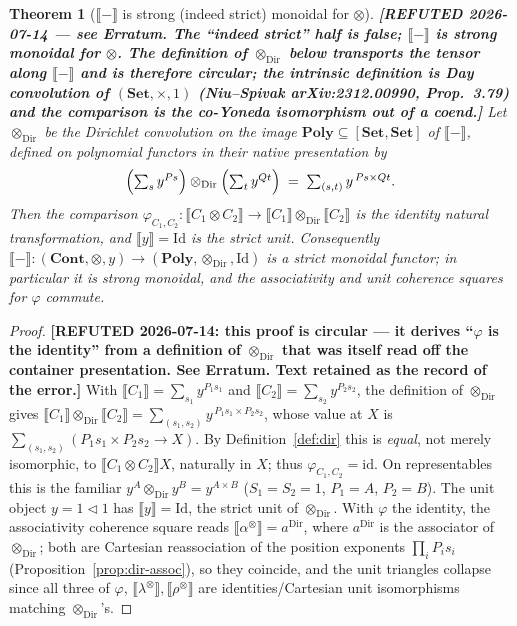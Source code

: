 \documentclass[11pt]{article}
\newtheorem{theorem}{Theorem}
\theoremstyle{definition}
\newcommand{\Set}{\mathbf{Set}}
\newcommand{\Cont}{\mathbf{Cont}}
\newcommand{\Poly}{\mathbf{Poly}}
\newcommand{\ext}[1]{\llbracket #1 \rrbracket}
\newcommand{\tri}{\mathbin{\triangleleft}}
\newcommand{\dir}{\mathbin{\otimes}}
\begin{document}
\begin{theorem}[$\ext{-}$ is strong (indeed strict) monoidal for $\dir$]
\label{thm:dir-strong}
\textbf{[REFUTED 2026-07-14 --- see Erratum. The ``indeed strict'' half is
false; $\ext{-}$ is strong monoidal for $\dir$. The definition of
$\dir_{\mathrm{Dir}}$ below transports the tensor along $\ext{-}$ and is
therefore circular; the intrinsic definition is Day convolution of
$(\Set,\times,1)$ (Niu--Spivak arXiv:2312.00990, Prop.~3.79) and the comparison
is the co-Yoneda isomorphism out of a coend.]}
Let $\dir_{\mathrm{Dir}}$ be the Dirichlet convolution on the image
$\Poly\subseteq[\Set,\Set]$ of $\ext{-}$, defined on polynomial functors in
their native presentation by
\[
  \Bigl(\textstyle\sum_{s} y^{P s}\Bigr)\dir_{\mathrm{Dir}}
  \Bigl(\textstyle\sum_{t} y^{Q t}\Bigr)
  \;=\;\sum_{(s,t)} y^{\,P s\times Q t}.
\]
Then the comparison
$\varphi_{C_1,C_2}\colon \ext{C_1\dir C_2}\to\ext{C_1}\dir_{\mathrm{Dir}}\ext{C_2}$
is the \emph{identity} natural transformation, and $\ext y=\mathrm{Id}$ is the
strict unit. Consequently $\ext{-}\colon(\Cont,\dir,y)\to
(\Poly,\dir_{\mathrm{Dir}},\mathrm{Id})$ is a strict monoidal functor; in
particular it is strong monoidal, and the associativity and unit coherence
squares for $\varphi$ commute.
\end{theorem}

\begin{proof}
\textbf{[REFUTED 2026-07-14: this proof is circular --- it derives ``$\varphi$
is the identity'' from a definition of $\dir_{\mathrm{Dir}}$ that was itself
read off the container presentation. See Erratum. Text retained as the record
of the error.]}
With $\ext{C_1}=\sum_{s_1} y^{P_1 s_1}$ and $\ext{C_2}=\sum_{s_2} y^{P_2 s_2}$,
the definition of $\dir_{\mathrm{Dir}}$ gives
$\ext{C_1}\dir_{\mathrm{Dir}}\ext{C_2}=\sum_{(s_1,s_2)} y^{\,P_1 s_1\times P_2 s_2}$,
whose value at $X$ is $\sum_{(s_1,s_2)}(P_1 s_1\times P_2 s_2\to X)$. By
Definition~\ref{def:dir} this is \emph{equal}, not merely isomorphic, to
$\ext{C_1\dir C_2}X$, naturally in $X$; thus $\varphi_{C_1,C_2}=\mathrm{id}$. On
representables this is the familiar $y^{A}\dir_{\mathrm{Dir}} y^{B}=y^{A\times B}$
($S_1=S_2=1$, $P_1=A$, $P_2=B$). The unit object $y=1\tri1$ has
$\ext y=\mathrm{Id}$, the strict unit of $\dir_{\mathrm{Dir}}$. With $\varphi$
the identity, the associativity coherence square reads
$\ext{\alpha^{\dir}}=a^{\mathrm{Dir}}$, where $a^{\mathrm{Dir}}$ is the
associator of $\dir_{\mathrm{Dir}}$; both are Cartesian reassociation of the
position exponents $\prod_i P_i s_i$ (Proposition~\ref{prop:dir-assoc}), so they
coincide, and the unit triangles collapse since all three of $\varphi$,
$\ext{\lambda^{\dir}},\ext{\rho^{\dir}}$ are identities/Cartesian unit
isomorphisms matching $\dir_{\mathrm{Dir}}$'s.
\end{proof}
\end{document}
